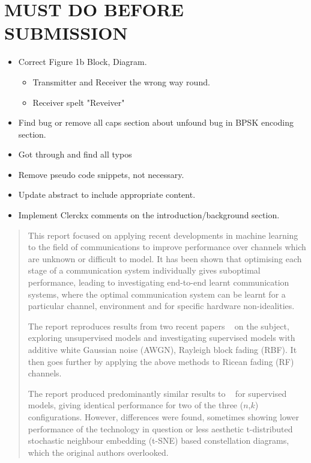 \documentclass[12pt,onecolumn,letterpaper]{article}
\begin{document}
\section*{MUST DO BEFORE SUBMISSION}

\begin{itemize}
   \item Correct Figure 1b Block, Diagram.
   \begin{itemize}
      \item Transmitter and Receiver the wrong way round.
      \item Receiver spelt "Reveiver"
   \end{itemize} 
   \item Find bug or remove all caps section about unfound bug in BPSK encoding section.
   \item Got through and find all typos
   \item Remove pseudo code snippets, not necessary.
   \item Update abstract to include appropriate content.
   \item Implement Clerckx comments on the introduction/background section.
\end{itemize}


\begin{abstract}   
   This report focused on applying recent developments in machine learning to the field of communications to improve performance over channels which are unknown or difficult to model. It has been shown that optimising each stage of a communication system individually gives suboptimal performance, leading to investigating end-to-end learnt communication systems, where the optimal communication system can be learnt for a particular channel, environment and for specific hardware non-idealities.
   
   The report reproduces results from two recent papers ~\cite{oShea,Aoudia} on the subject, exploring unsupervised models and investigating supervised models with additive white Gaussian noise (AWGN), Rayleigh block fading (RBF). It then goes further by applying the above methods to Ricean fading (RF) channels.
   
   The report produced predominantly similar results to ~\cite{oShea} for supervised models, giving identical performance for two of the three ($n$,$k$) configurations. However, differences were found, sometimes showing lower performance of the technology in question or less aesthetic t-distributed stochastic neighbour embedding (t-SNE) based constellation diagrams, which the original authors overlooked.
\end{abstract}
\pagebreak
\end{document}
